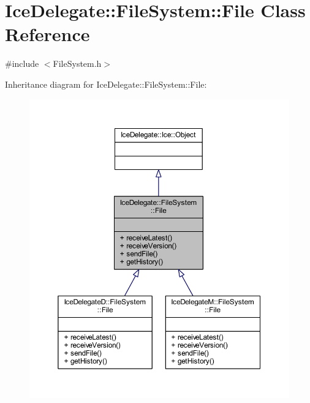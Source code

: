\hypertarget{class_ice_delegate_1_1_file_system_1_1_file}{}\section{Ice\+Delegate\+:\+:File\+System\+:\+:File Class Reference}
\label{class_ice_delegate_1_1_file_system_1_1_file}


{\ttfamily \#include $<$File\+System.\+h$>$}



Inheritance diagram for Ice\+Delegate\+:\+:File\+System\+:\+:File\+:
\nopagebreak
\begin{figure}[H]
\begin{center}
\leavevmode
\includegraphics[width=350pt]{class_ice_delegate_1_1_file_system_1_1_file__inherit__graph}
\end{center}
\end{figure}


